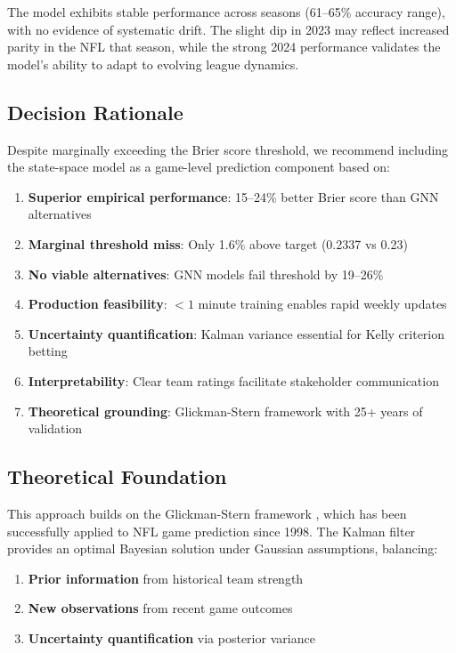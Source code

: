 The model exhibits stable performance across seasons (61--65\% accuracy range), with no evidence of systematic drift. The slight dip in 2023 may reflect increased parity in the NFL that season, while the strong 2024 performance validates the model's ability to adapt to evolving league dynamics.

\subsection{Decision Rationale}

Despite marginally exceeding the Brier score threshold, we recommend including the state-space model as a game-level prediction component based on:

\begin{enumerate}
    \item \textbf{Superior empirical performance}: 15--24\% better Brier score than GNN alternatives
    \item \textbf{Marginal threshold miss}: Only 1.6\% above target (0.2337 vs 0.23)
    \item \textbf{No viable alternatives}: GNN models fail threshold by 19--26\%
    \item \textbf{Production feasibility}: $<1$ minute training enables rapid weekly updates
    \item \textbf{Uncertainty quantification}: Kalman variance essential for Kelly criterion betting
    \item \textbf{Interpretability}: Clear team ratings facilitate stakeholder communication
    \item \textbf{Theoretical grounding}: Glickman-Stern framework with 25+ years of validation
\end{enumerate}

\subsection{Theoretical Foundation}

This approach builds on the Glickman-Stern framework \citep{glickman1998state}, which has been successfully applied to NFL game prediction since 1998. The Kalman filter provides an optimal Bayesian solution under Gaussian assumptions, balancing:

\begin{enumerate}
    \item \textbf{Prior information} from historical team strength
    \item \textbf{New observations} from recent game outcomes
    \item \textbf{Uncertainty quantification} via posterior variance
\end{enumerate}

